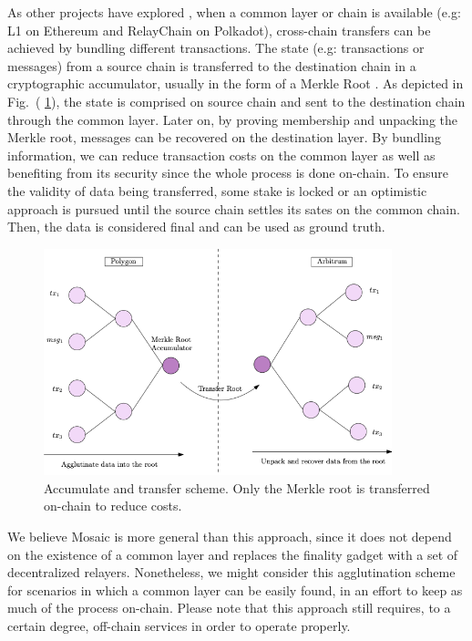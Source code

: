 As other projects have explored \cite{HopRollups, MOVRMOVR}, when a common layer or chain is available (e.g: L1 on Ethereum and RelayChain on Polkadot), cross-chain transfers can be achieved by bundling different transactions. The state (e.g: transactions or messages) from a source chain is transferred to the destination chain in a cryptographic accumulator, usually in the form of a Merkle Root \cite{Becker2008MerkleCryptanalysis}. As depicted in Fig.~( \ref{fig:accumulator}), the state is comprised on source chain and sent to the destination chain through the common layer. Later on, by proving membership  and unpacking the Merkle root, messages can be recovered on the destination layer.  By bundling information, we can reduce transaction costs on the common layer as well as benefiting from its security since the whole process is done on-chain. To ensure the validity of data being transferred, some stake is locked or an optimistic approach is pursued until the source chain settles its sates on the common chain. Then, the data is considered final and can be used as ground truth.

\begin{figure}[H]
    \centering
    \includegraphics[width=0.9\textwidth]{images/mosaic/phase3/accumulator.png}
    \caption{Accumulate and transfer scheme. Only the Merkle root is transferred on-chain to  reduce costs.}
    \label{fig:accumulator}
\end{figure}

We believe Mosaic is more general than this approach, since it does not depend on the existence of a common layer and replaces the finality gadget with a set of decentralized relayers. Nonetheless, we might consider this agglutination scheme for scenarios in which a common layer can be easily found, in an effort to keep as much of the process on-chain. Please note that this approach still requires, to a certain degree, off-chain services in order to operate properly.